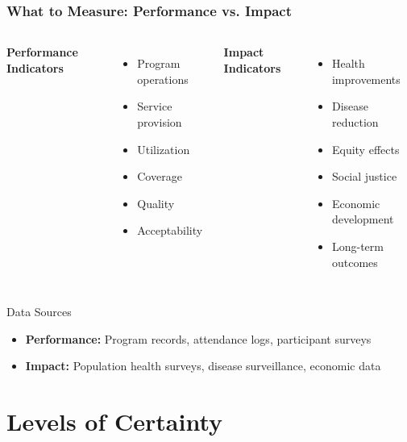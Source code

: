 \documentclass{beamer}
\begin{document}
\begin{frame}
\frametitle{What to Measure: Performance vs. Impact}

\begin{columns}[t] %
\textbf{Performance Indicators}
\begin{itemize}[itemsep=0.2em] %
    \item Program operations
    \item Service provision
    \item Utilization
    \item Coverage
    \item Quality
    \item Acceptability
\end{itemize}

\textbf{Impact Indicators}
\begin{itemize}[itemsep=0.2em] %
    \item Health improvements
    \item Disease reduction
    \item Equity effects
    \item Social justice
    \item Economic development
    \item Long-term outcomes
\end{itemize}
\end{columns}

\vspace{0.3cm}
{
\begin{block}{Data Sources}
\small
\begin{itemize}[itemsep=0.1em] %
    \item \textbf{Performance:} Program records, attendance logs, participant surveys
    \item \textbf{Impact:} Population health surveys, disease surveillance, economic data
\end{itemize}
\end{block}}
\end{frame}

\section{Levels of Certainty}
\end{document}
